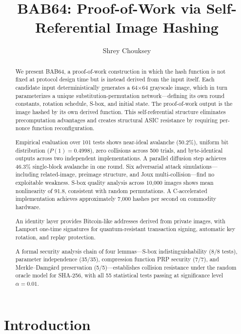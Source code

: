 \documentclass[preprint]{iacrtrans}
\title{BAB64: Proof-of-Work via Self-Referential Image Hashing}
\author{Shrey Chouksey\inst{1}}
\institute{Independent Researcher \email{choukseyshrey@gmail.com}}
\begin{document}

\maketitle

\begin{abstract}
We present BAB64, a proof-of-work construction in which the hash function is not fixed at protocol design time but is instead derived from the input itself. Each candidate input deterministically generates a 64$\times$64 grayscale image, which in turn parameterizes a unique substitution-permutation network---defining its own round constants, rotation schedule, S-box, and initial state. The proof-of-work output is the image hashed by its own derived function. This self-referential structure eliminates precomputation advantages and creates structural ASIC resistance by requiring per-nonce function reconfiguration.

Empirical evaluation over 101 tests shows near-ideal avalanche (50.2\%), uniform bit distribution ($P(1) = 0.4998$), zero collisions across 500 trials, and byte-identical outputs across two independent implementations. A parallel diffusion step achieves 46.3\% single-block avalanche in one round. Six adversarial attack simulations---including related-image, preimage structure, and Joux multi-collision---find no exploitable weakness. S-box quality analysis across 10{,}000 images shows mean nonlinearity of 91.8, consistent with random permutations. A C-accelerated implementation achieves approximately 7{,}000 hashes per second on commodity hardware.

An identity layer provides Bitcoin-like addresses derived from private images, with Lamport one-time signatures for quantum-resistant transaction signing, automatic key rotation, and replay protection.

A formal security analysis chain of four lemmas---S-box indistinguishability (8/8 tests), parameter independence (35/35), compression function PRP security (7/7), and Merkle--Damg{\aa}rd preservation (5/5)---establishes collision resistance under the random oracle model for SHA-256, with all 55 statistical tests passing at significance level $\alpha = 0.01$.
\end{abstract}

\section{Introduction}
\end{document}

